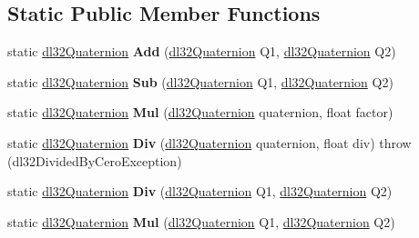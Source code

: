 \subsection*{Static Public Member Functions}
\begin{DoxyCompactItemize}
\item 
\hypertarget{classdl32_quaternion_afc616edb189df2fef4af3318324273eb}{static \hyperlink{classdl32_quaternion}{dl32\-Quaternion} {\bfseries Add} (\hyperlink{classdl32_quaternion}{dl32\-Quaternion} Q1, \hyperlink{classdl32_quaternion}{dl32\-Quaternion} Q2)}\label{classdl32_quaternion_afc616edb189df2fef4af3318324273eb}

\item 
\hypertarget{classdl32_quaternion_af3fbc76571fb10e3e2bf5abec216e105}{static \hyperlink{classdl32_quaternion}{dl32\-Quaternion} {\bfseries Sub} (\hyperlink{classdl32_quaternion}{dl32\-Quaternion} Q1, \hyperlink{classdl32_quaternion}{dl32\-Quaternion} Q2)}\label{classdl32_quaternion_af3fbc76571fb10e3e2bf5abec216e105}

\item 
\hypertarget{classdl32_quaternion_a3fafaaca034fffe7977c3a216bda881b}{static \hyperlink{classdl32_quaternion}{dl32\-Quaternion} {\bfseries Mul} (\hyperlink{classdl32_quaternion}{dl32\-Quaternion} quaternion, float factor)}\label{classdl32_quaternion_a3fafaaca034fffe7977c3a216bda881b}

\item 
\hypertarget{classdl32_quaternion_a3e9effa2204990b120664bc5f501c101}{static \hyperlink{classdl32_quaternion}{dl32\-Quaternion} {\bfseries Div} (\hyperlink{classdl32_quaternion}{dl32\-Quaternion} quaternion, float div)  throw (dl32\-Divided\-By\-Cero\-Exception)}\label{classdl32_quaternion_a3e9effa2204990b120664bc5f501c101}

\item 
\hypertarget{classdl32_quaternion_a01353e5bdd3427b9f92be9e9cde180d8}{static \hyperlink{classdl32_quaternion}{dl32\-Quaternion} {\bfseries Div} (\hyperlink{classdl32_quaternion}{dl32\-Quaternion} Q1, \hyperlink{classdl32_quaternion}{dl32\-Quaternion} Q2)}\label{classdl32_quaternion_a01353e5bdd3427b9f92be9e9cde180d8}

\item 
\hypertarget{classdl32_quaternion_aeeb8fd5b506a46e846807fc54a57f075}{static \hyperlink{classdl32_quaternion}{dl32\-Quaternion} {\bfseries Mul} (\hyperlink{classdl32_quaternion}{dl32\-Quaternion} Q1, \hyperlink{classdl32_quaternion}{dl32\-Quaternion} Q2)}\label{classdl32_quaternion_aeeb8fd5b506a46e846807fc54a57f075}

\end{DoxyCompactItemize}

